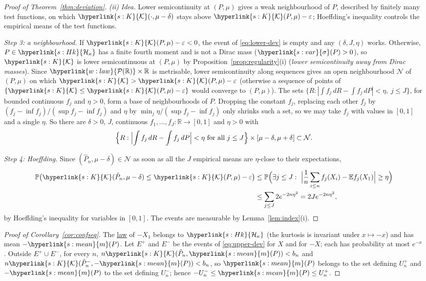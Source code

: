 \documentclass[11pt]{article}
\newcommand{\E}{\mathbb{E}}
\newcommand{\Prob}{\mathbb{P}}
\newcommand{\R}{\mathbb{R}}
\newcommand{\Pspace}{\term{w:law}{\mathcal{P}(\mathbb{R})}}
\newcommand{\sy}[2]{{\hyperlink{#1}{#2}}}
\newcommand{\term}[2]{\hyperlink{#1}{#2}}
\newcommand{\mean}{\sy{s:mean}{m}}
\newcommand{\sd}{\sy{s:var}{\sigma}}
\newcommand{\Hk}{\sy{s:Hk}{\mathcal{H}_{\kappa}}}
\newcommand{\Kc}{\sy{s:K}{\mathcal{K}}}
\begin{document}
\begin{proof}[Proof of Theorem~\ref{thm:deviation}]
\emph{(ii) Idea.} Lower semicontinuity at $(P,\mu)$ gives a weak neighbourhood of $P$, described by finitely many
test functions, on which $\Kc(\cdot,\mu-\delta)$ stays above $\Kc(P,\mu)-\varepsilon$; Hoeffding's inequality controls the
empirical means of the test functions.

\emph{Step 3: a neighbourhood.} If $\Kc(P,\mu)-\varepsilon<0$, the event of \eqref{eq:lower-dev} is empty and any $(\delta,J,\eta)$ works.
Otherwise, $P\in\Hk$ has a finite fourth moment and is not a Dirac mass ($\sd(P)>0$), so $\Kc$ is lower
semicontinuous at $(P,\mu)$ by Proposition~\ref{prop:regularity}(i) (\emph{lower semicontinuity away from Dirac masses}). Since $\Pspace\times\R$ is metrisable, lower
semicontinuity along sequences gives an open neighbourhood $\mathcal N$ of $(P,\mu)$ on which
$\Kc>\Kc(P,\mu)-\varepsilon$ (otherwise a sequence of points of $\{\Kc\le\Kc(P,\mu)-\varepsilon\}$ would converge to $(P,\mu)$). The sets
$\{R:|\int f_j\,dR-\int f_j\,dP|<\eta,\ j\le J\}$, for bounded continuous $f_j$ and $\eta>0$, form a base of neighbourhoods of
$P$. Dropping the constant $f_j$, replacing each other $f_j$ by $(f_j-\inf f_j)/(\sup f_j-\inf f_j)$ and $\eta$ by
$\min_j\eta/(\sup f_j-\inf f_j)$ only shrinks such a set, so we may take $f_j$ with values in $[0,1]$ and a single $\eta$. So there are
$\delta>0$, $J$, continuous $f_1,\dots,f_J:\R\to[0,1]$ and $\eta>0$ with
\begin{equation*}
  \Bigl\{R:\Bigl|\int f_j\,dR-\int f_j\,dP\Bigr|<\eta\ \text{for all } j\le J\Bigr\}\times[\mu-\delta,\mu+\delta]\subset\mathcal N .
\end{equation*}

\emph{Step 4: Hoeffding.} Since $(\hat P_n,\mu-\delta)\in\mathcal N$ as soon as all the $J$ empirical means are $\eta$-close to their
expectations,
\begin{align*}
  \Prob\bigl(\Kc(\hat P_n,\mu-\delta)\le\Kc(P,\mu)-\varepsilon\bigr)
  &\le\Prob\Bigl(\exists j\le J:\ \Bigl|\frac1n\sum_{i\le n}f_j(X_i)-\E f_j(X_1)\Bigr|\ge\eta\Bigr)\\
  &\le\sum_{j\le J}2e^{-2n\eta^2}=2Je^{-2n\eta^2},
\end{align*}
by Hoeffding's inequality for variables in $[0,1]$. The events are measurable by Lemma~\ref{lem:index}(i).
\end{proof}

\begin{proof}[Proof of Corollary~\ref{cor:confseq}]
The \term{w:law}{law} of $-X_1$ belongs to $\Hk$ (the kurtosis is invariant under $x\mapsto-x$) and has mean $-\mean(P)$. Let $E^+$ and
$E^-$ be the events of \eqref{eq:upper-dev} for $X$ and for $-X$; each has probability at most $e^{-x}$. Outside
$E^+\cup E^-$, for every $n$, $n\Kc(\hat P_n,\mean(P))<b_n$ and $n\Kc(\hat P^-_n,-\mean(P))<b_n$, so $\mean(P)$ belongs to the set defining
$U^+_n$ and $-\mean(P)$ to the set defining $U^-_n$; hence $-U^-_n\le\mean(P)\le U^+_n$.
\end{proof}
\end{document}
